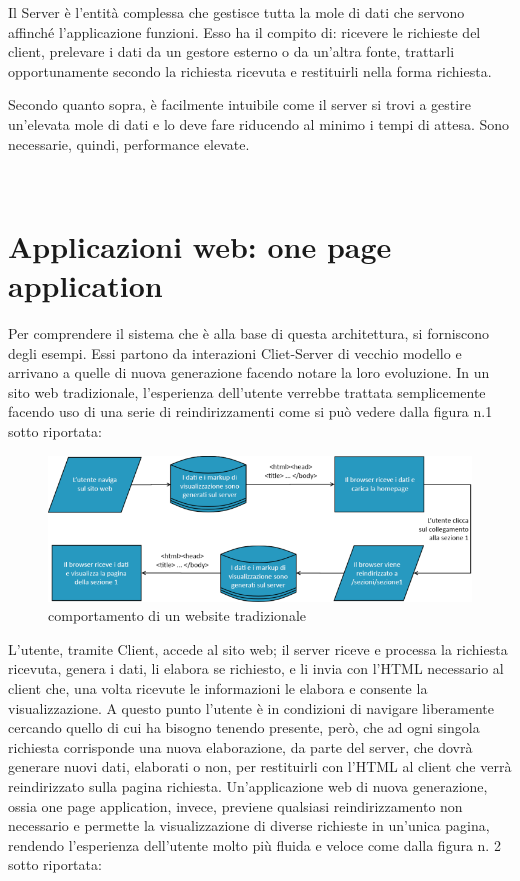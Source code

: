 Il Server è l’entità complessa che gestisce tutta la mole di dati che servono affinché l’applicazione funzioni. Esso ha il compito di: ricevere le richieste del client, prelevare i dati da un gestore esterno o da un’altra fonte, trattarli opportunamente secondo la richiesta ricevuta e restituirli nella forma richiesta.

Secondo quanto sopra, è facilmente intuibile come il server si trovi a gestire un’elevata mole di dati e lo deve fare riducendo al minimo i tempi di attesa. Sono necessarie, quindi, performance elevate.

\newpage

 \section{Applicazioni web: one page application} %
\label{sec:applicazioni_web_one_page_application}

Per comprendere il sistema che è alla base di questa architettura, si forniscono degli esempi. Essi partono da interazioni Cliet-Server di vecchio modello e arrivano a quelle di nuova generazione facendo notare la loro evoluzione. In un sito web tradizionale, l’esperienza dell’utente verrebbe trattata semplicemente facendo uso di una serie di reindirizzamenti come si può vedere dalla figura n.1 sotto riportata:\\

\vspace{1cm}
\begin{figure}[htbp]
\begin{center}
\includegraphics[width=13cm]{contents/images/traditional_web_site}
\end{center}
\caption{comportamento di un website tradizionale}
\label{fig:flow_0}
\end{figure}
\vspace{1cm}

L’utente, tramite Client, accede al sito web; il server riceve e processa la richiesta ricevuta, genera i dati, li elabora se richiesto, e li invia con l’HTML necessario al client che, una volta ricevute le informazioni le elabora e consente la visualizzazione. A questo punto l’utente è in condizioni di navigare liberamente cercando quello di cui ha bisogno tenendo presente, però, che ad ogni singola richiesta corrisponde una nuova elaborazione, da parte del server, che dovrà generare nuovi dati, elaborati o non, per restituirli con l’HTML al client che verrà reindirizzato sulla pagina richiesta.
\newpage
Un’applicazione web di nuova generazione, ossia one page application, invece, previene qualsiasi reindirizzamento non necessario e permette la visualizzazione di diverse richieste in un’unica pagina, rendendo l’esperienza dell’utente molto più fluida e veloce come dalla figura n. 2 sotto riportata:

